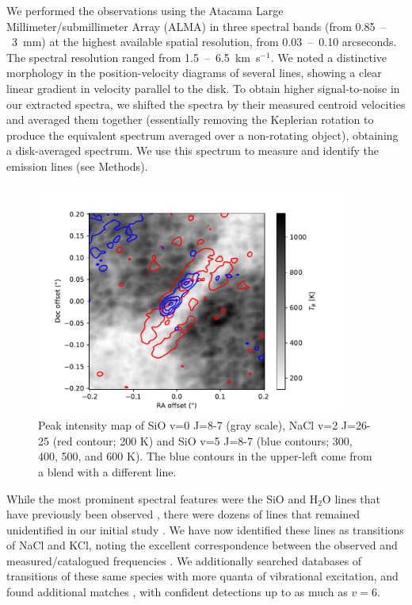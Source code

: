 \documentclass[12pt]{article}
\newcommand{\bam}[1]{\textcolor{green!65!black}{\textbf{[BAM: #1]}}}
\newcommand{\water}{H$_{2}$O\xspace}		%
\newcommand{\kms}{\textrm{km~s}\ensuremath{^{-1}}\xspace}	%
\begin{document}

We performed the observations using the Atacama Large Millimeter/submillimeter
Array (ALMA) in three spectral bands (from 0.85~--~3~mm) at the highest
available spatial resolution, from 0.03~--~0.10 arcseconds. The spectral
resolution ranged from 1.5~--~6.5~\kms.  We noted a
distinctive morphology in the position-velocity diagrams of several lines,
showing a clear linear gradient in velocity parallel to the disk. To obtain
higher signal-to-noise in our extracted spectra, we shifted the spectra by
their measured centroid velocities and averaged them together (essentially
removing  the Keplerian rotation to produce the equivalent spectrum averaged
over a non-rotating object), obtaining a disk-averaged spectrum.  We use this
spectrum to measure and  identify the emission lines (see Methods).


\begin{figure}[!htp]
\includegraphics[scale=1,width=4in]{figures/SiO_8-7_on_NaClv=2_26-25.pdf}
\caption{Peak intensity map of SiO v=0 J=8-7 (gray scale), NaCl v=2 J=26-25
(red contour; 200 K) and {SiO v=5 J=8-7} (blue contours; 300, 400, 500, and 600
K).  The blue contours in the upper-left come from a blend with a different
line.
}
\label{fig:sioonnacl}
\end{figure}


While the most prominent spectral features were the SiO and \water lines that
have previously been observed \cite{Goddi2013a,Hirota2014a}, there were dozens
of lines that remained unidentified in our initial study \cite{Ginsburg2018b}.
We have now identified these lines as transitions of NaCl and KCl, noting the
excellent correspondence between the observed and measured/catalogued
frequencies \cite{Caris2002a,Caris2004a,Muller2005a,Lovas2005b,Pickett1998a}.
We additionally searched databases of transitions of these same species with
more quanta of vibrational excitation, and found additional matches
\cite{Barton2014a,Cabezas2016a}, with confident detections up to as much as
$v=6$.
\end{document}
